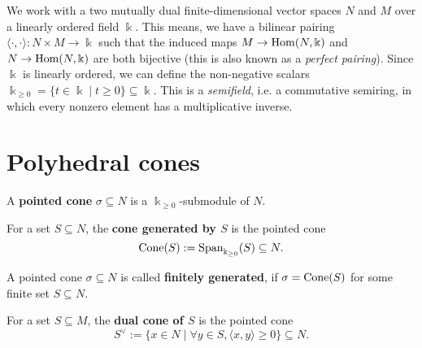 We work with a two mutually dual finite-dimensional vector spaces \( N
\) and \( M \) over a linearly ordered field \( \Bbbk \). This means,
we have a bilinear pairing \( \langle \cdot, \cdot \rangle \colon N
\times M \to \Bbbk \) such that the induced maps \( M \to
\operatorname{Hom}(N,\Bbbk) \) and \( N \to \operatorname{Hom}(N,\Bbbk) \) are both bijective
(this is also known as a \emph{perfect pairing}). Since \( \Bbbk \) is
linearly ordered, we can define the non-negative scalars \(\Bbbk_{\geq
0} = \{t \in \Bbbk \mid t \geq 0 \} \subseteq \Bbbk\). This is a
\emph{semifield}, i.e. a commutative semiring, in which every nonzero
element has a multiplicative inverse.




\section{Polyhedral cones}

\begin{definition}
  \label{pointed-cone}
  \uses{}
  \leanok
  A {\bf pointed cone} \( \sigma \subseteq N \) is a \( \Bbbk_{\geq 0}
  \)-submodule of \( N \).
\end{definition}

\begin{definition}
  \label{cone-span}
  \leanok
  For a set \( S \subseteq N \), the {\bf cone generated by \( S \)}
  is the pointed cone
  \[
      \operatorname{Cone}(S) := \operatorname{Span}_{\Bbbk_{\geq 0}}(S) \subseteq N.
  \]
\end{definition}

\begin{definition}
  \label{cone-finitely-generated}
  \leanok
  A pointed cone \( \sigma \subseteq N \) is called {\bf finitely
  generated}, if \( \sigma = \operatorname{Cone}(S) \) for some finite set \( S
  \subseteq N \).
\end{definition}

\begin{definition}
  \label{dual-cone}
  \leanok
  For a set \( S \subseteq M \), the {\bf dual cone of \( S \)} is
  the pointed cone
  \[
      S^\vee := \{x \in N \mid \forall y \in S, \langle x, y \rangle
      \geq 0 \} \subseteq N.
  \]
\end{definition}

